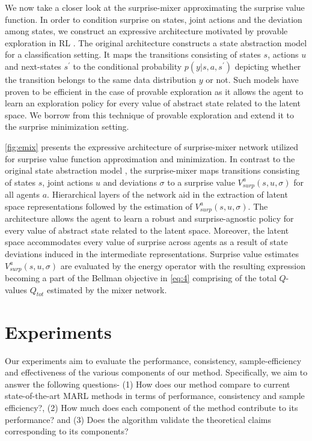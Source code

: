 \documentclass{article}
\begin{document}
\begin{multicols}{2}
\begin{figure}
\end{figure}
We now take a closer look at the surprise-mixer approximating the surprise value function. In order to condition surprise on states, joint actions and the deviation among states, we construct an expressive architecture motivated by provable exploration in RL \cite{homer}. The original architecture constructs a state abstraction model for a classification setting. It maps the transitions consisting of states $s$, actions $u$ and next-states $s^{'}$ to the conditional probability $p(y|s,a,s^{'})$ depicting whether the transition belongs to the same data distribution $y$ or not. Such models have proven to be efficient in the case of provable exploration \cite{homer} as it allows the agent to learn an exploration policy for every value of abstract state related to the latent space. We borrow from this technique of provable exploration and extend it to the surprise minimization setting.

\autoref{fig:emix} presents the expressive architecture of surprise-mixer network utilized for surprise value function approximation and minimization. In contrast to the original state abstraction model \cite{homer}, the surprise-mixer maps transitions consisting of states $s$, joint actions $u$ and deviations $\sigma$ to a surprise value $V_{surp}^{a}(s,u,\sigma)$ for all agents $a$. Hierarchical layers of the network aid in the extraction of latent space representations followed by the estimation of $V_{surp}^{a}(s,u,\sigma)$. The architecture allows the agent to learn a robust and surprise-agnostic policy for every value of abstract state related to the latent space. Moreover, the latent space accommodates every value of surprise across agents as a result of state deviations induced in the intermediate representations. Surprise value estimates $V_{surp}^{a}(s,u,\sigma)$ are evaluated by the energy operator with the resulting expression becoming a part of the Bellman objective in \autoref{eq:4} comprising of the total $Q$-values $Q_{tot}$ estimated by the mixer network. 


\section{Experiments}
Our experiments aim to evaluate the performance, consistency, sample-efficiency and effectiveness of the various components of our method. Specifically, we aim to answer the following questions- (1) How does our method compare to current state-of-the-art MARL methods in terms of performance, consistency and sample efficiency?, (2) How much does each component of the method contribute to its performance? and (3) Does the algorithm validate the theoretical claims corresponding to its components?

\end{multicols}
\end{document}
